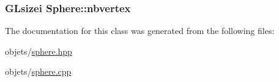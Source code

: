 \hypertarget{class_sphere_a4e8e9f5ba889e700b7244bc70232a271}{
\subsubsection[{nbvertex}]{\setlength{\rightskip}{0pt plus 5cm}G\+Lsizei Sphere\+::nbvertex\hspace{0.3cm}{\ttfamily [private]}}}\label{class_sphere_a4e8e9f5ba889e700b7244bc70232a271}


The documentation for this class was generated from the following files\+:\begin{DoxyCompactItemize}
\item 
objets/\hyperlink{sphere_8hpp}{sphere.\+hpp}\item 
objets/\hyperlink{sphere_8cpp}{sphere.\+cpp}\end{DoxyCompactItemize}
